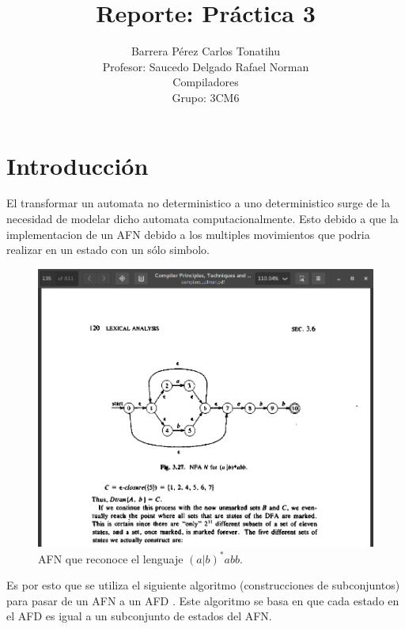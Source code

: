\documentclass[titlepage]{article}
\title{Reporte: Práctica 3}
\author{Barrera Pérez Carlos Tonatihu \\ Profesor: Saucedo Delgado Rafael Norman \\ Compiladores \\ Grupo: 3CM6 }
\begin{document}
\maketitle
\tableofcontents
\newpage
\section{Introducción}
El transformar un automata no deterministico a uno deterministico surge de la necesidad de modelar dicho automata computacionalmente. Esto debido a que la implementacion de un AFN debido a los multiples movimientos que podria realizar en un estado con un sólo simbolo.

\begin{figure}[H]
        \begin{center}
        \includegraphics[width=\textwidth]{AFN.png}
        \caption{AFN que reconoce el lenguaje $(a|b)^{*}abb$.}
        \label{fig:AFN}
        \end{center}
    \end{figure}

Es por esto que se utiliza el siguiente algoritmo (construcciones de subconjuntos) para pasar de un AFN a un AFD \cite{compis}. Este algoritmo se basa en que cada estado en el AFD es igual a un subconjunto de estados del AFN.
\end{document}
